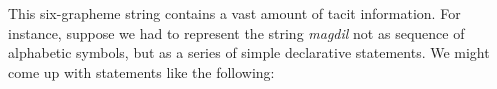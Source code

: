This six-grapheme string contains a vast amount of tacit information. For instance, 
suppose we had to represent the string \textit{magdil} not as sequence of alphabetic 
symbols, but as a series of simple declarative statements. We might come up with 
statements like the following: 
